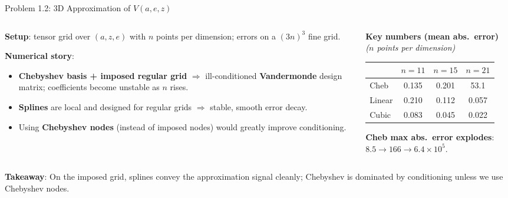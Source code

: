 \documentclass[aspectratio=169,11pt]{beamer}
\begin{document}
\begin{frame}{Problem 1.2: 3D Approximation of $V(a,e,z)$}
    \vspace{-0.6em}
    \begin{columns}[T]
        \begin{column}{0.52\textwidth}
            \footnotesize
            \textbf{Setup}: tensor grid over $(a,z,e)$ with $n$ points per dimension; errors on a $(3n)^3$ fine grid.
            \vspace{0.3em}

            \textbf{Numerical story}:
            \begin{itemize}\setlength\itemsep{0.25em}
                \item \textbf{Chebyshev basis + imposed regular grid} $\Rightarrow$ ill-conditioned \textbf{Vandermonde} design matrix; coefficients become unstable as $n$ rises.
                \item \textbf{Splines} are local and designed for regular grids $\Rightarrow$ stable, smooth error decay.
                \item Using \textbf{Chebyshev nodes} (instead of imposed nodes) would greatly improve conditioning.
            \end{itemize}
        \end{column}
        \begin{column}{0.46\textwidth}
            \scriptsize
            \textbf{Key numbers (mean abs.\ error)}\\[-0.2em]
            \textit{($n$ points per dimension)}\\[0.3em]
            \begin{center}
            \renewcommand{\arraystretch}{1.15}
            \begin{tabular}{lccc}
                \toprule
                & $n=11$ & $n=15$ & $n=21$ \\
                \midrule
                Cheb & 0.135 & 0.201 & 53.1 \\
                Linear & 0.210 & 0.112 & 0.057 \\
                Cubic & 0.083 & 0.045 & 0.022 \\
                \bottomrule
            \end{tabular}
            \end{center}
            \vspace{0.2em}
            \scriptsize
            \textbf{Cheb max abs.\ error explodes}: $8.5 \to 166 \to 6.4\times 10^{5}$.
        \end{column}
    \end{columns}
    \vspace{0.1em}
    \footnotesize
    \textbf{Takeaway}: On the imposed grid, splines convey the approximation signal cleanly; Chebyshev is dominated by conditioning unless we use Chebyshev nodes.
\end{frame}
\end{document}
